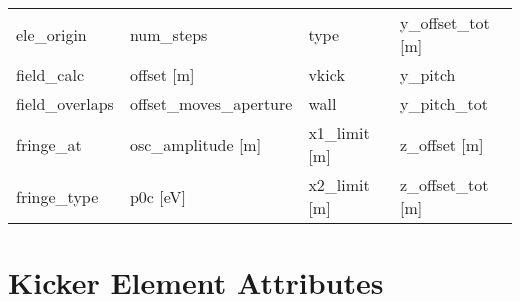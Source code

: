 \begin{tabular}{llll}
ele_origin                     & num_steps                      & type                           & y_offset_tot [m]               \\
field_calc                     & offset [m]                     & vkick                          & y_pitch                        \\
field_overlaps                 & offset_moves_aperture          & wall                           & y_pitch_tot                    \\
fringe_at                      & osc_amplitude [m]              & x1_limit [m]                   & z_offset [m]                   \\
fringe_type                    & p0c [eV]                       & x2_limit [m]                   & z_offset_tot [m]               \\
 \bottomrule
 \end{tabular}
 \vfill
 
 \section{Kicker Element Attributes}
 \label{s:list.kicker}
 
